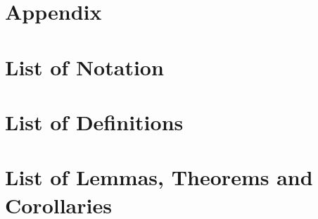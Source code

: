 \newpage
\appendix
\section*{Appendix}


\section{List of Notation}

\section{List of Definitions}

\section{List of Lemmas, Theorems and Corollaries}
